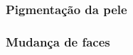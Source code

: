 \documentclass{beamer}
\begin{document}
\begin{frame}
\frametitle{Pigmentação da pele}
\begin{figure}[h]
\centering
{}
\end{figure}
\end{frame}


\begin{frame}
\frametitle{Mudança de faces}

\begin{figure}[h]
\centering
{}
\end{figure}

\end{frame}
\end{document}
